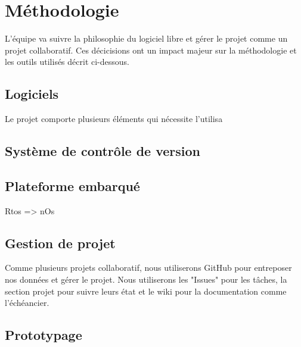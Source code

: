 \section{Méthodologie}
L'équipe va suivre la philosophie du logiciel libre et gérer le projet comme un projet collaboratif. Ces décicisions 
ont un impact majeur sur la méthodologie et les outils utilisés décrit ci-dessous. \\

\subsection{Logiciels}
Le projet comporte plusieurs éléments qui nécessite l'utilisa

\subsection{Système de contrôle de version}
\subsection{Plateforme embarqué}
Rtos => nOs
\subsection{Gestion de projet}
Comme plusieurs projets collaboratif, nous utiliserons GitHub pour entreposer nos données et gérer le projet. Nous utiliserons les "Issues" pour les tâches, la section projet pour suivre leurs état et le wiki pour la documentation comme l'échéancier.
\subsection{Prototypage}

\subsection{}
\subsection{}
\subsection{}
